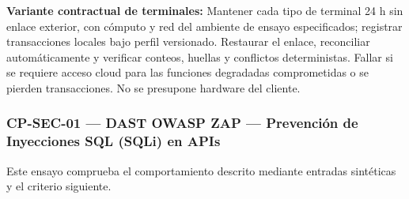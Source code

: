 \par\noindent\textbf{Variante contractual de terminales:} Mantener cada tipo de terminal 24 h sin enlace exterior, con cómputo y red del ambiente de ensayo especificados; registrar transacciones locales bajo perfil versionado. Restaurar el enlace, reconciliar automáticamente y verificar conteos, huellas y conflictos deterministas. Fallar si se requiere acceso cloud para las funciones degradadas comprometidas o se pierden transacciones. No se presupone hardware del cliente.\par\par






\subsubsection*{CP-SEC-01 — DAST OWASP ZAP — Prevención de Inyecciones SQL (SQLi) en APIs}\label{sec:9-cp-sec-01}
Este ensayo comprueba el comportamiento descrito mediante entradas sintéticas y el criterio siguiente.

